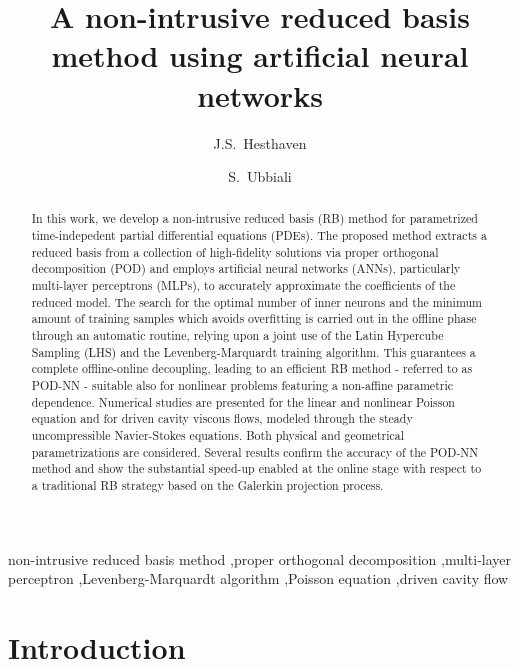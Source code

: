 \documentclass{elsarticle}
\theoremstyle{theorem}
\theoremstyle{definition}
\theoremstyle{remark}
\theoremstyle{proposition}
\numberwithin{figure}{section}
\begin{document}
	
	\begin{frontmatter}
		\title{A non-intrusive reduced basis method using artificial neural networks}
		
		\author{J.S.~Hesthaven}
		
		\author{S.~Ubbiali}
		
		\address{\'Ecole Polytechnique F\'ed\'erale de Lausanne (EPFL), CH-1015 Lausanne, Switzerland}
		
		\begin{abstract}
			In this work, we develop a non-intrusive reduced basis (RB) method for pa\-ra\-me\-tri\-zed time-indepedent partial differential equations (PDEs). The proposed method extracts a reduced basis from a collection of high-fidelity solutions via proper orthogonal decomposition (POD) and employs artificial neural networks (ANNs), particularly multi-layer perceptrons (MLPs), to accurately approximate the coefficients of the reduced model. The search for the optimal number of inner neurons and the minimum amount of training samples which avoids overfitting is carried out in the offline phase through an automatic routine, relying upon a joint use of the Latin Hypercube Sampling (LHS) and the Levenberg-Marquardt training algorithm. This guarantees a complete offline-online decoupling, leading to an efficient RB method - referred to as POD-NN - suitable also for nonlinear problems featuring a non-affine parametric dependence. Numerical studies are presented for the linear and nonlinear Poisson equation and for driven cavity viscous flows, modeled through the steady uncompressible Navier-Stokes equations. Both physical and geometrical parametrizations are considered. Several results confirm the accuracy of the POD-NN method and show the substantial speed-up enabled at the online stage with respect to a traditional RB strategy based on the Galerkin projection process.
		\end{abstract}
		
		\begin{keyword}
			non-intrusive reduced basis method \sep proper orthogonal decomposition \sep multi-layer perceptron \sep Levenberg-Marquardt algorithm \sep Poisson equation \sep driven cavity flow
		\end{keyword}
	\end{frontmatter}
	
	
	
	\section{Introduction}
	\label{section:Introduction}
		
\end{document}
